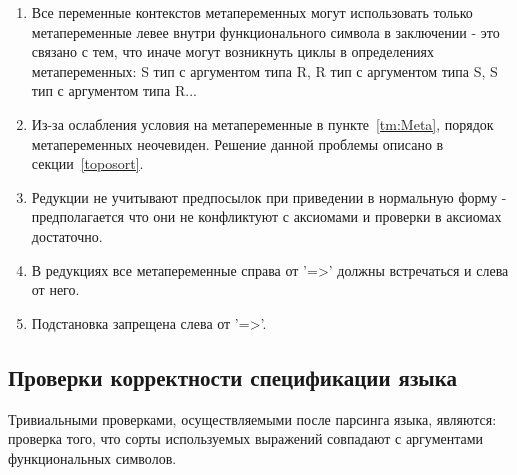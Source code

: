 \begin{enumerate}
\item Все переменные контекстов метапеременных могут использовать только метапеременные левее внутри функционального символа в заключении - это связано с тем, что иначе могут возникнуть циклы в определениях метапеременных: S тип с аргументом типа R, R тип с аргументом типа S, S тип с аргументом типа R...

\item Из-за ослабления условия на метапеременные в пункте~\ref{tm:Meta}, порядок метапеременных неочевиден. Решение данной проблемы описано в секции~\ref{toposort}.

\item Редукции не учитывают предпосылок при приведении в нормальную форму - предполагается что они не конфликтуют с аксиомами и проверки в аксиомах достаточно.

\item В редукциях все метапеременные справа от '=>' должны встречаться и слева от него.

\item Подстановка запрещена слева от '=>'.



\end{enumerate}

\subsection{Проверки корректности спецификации языка}

Тривиальными проверками, осуществляемыми после парсинга языка, являются: проверка того, что сорты используемых выражений совпадают с аргументами функциональных символов.
